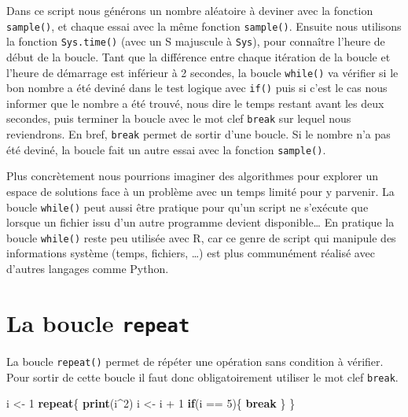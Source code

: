 \documentclass[twoside,symmetric]{book}
\newenvironment{Shaded}{}{}
\newcommand{\ControlFlowTok}[1]{\textbf{#1}}
\newcommand{\DecValTok}[1]{#1}
\newcommand{\KeywordTok}[1]{\textbf{#1}}
\newcommand{\NormalTok}[1]{#1}
\newcommand{\OperatorTok}[1]{#1}
\newcommand{\StringTok}[1]{#1}
\begin{document}
Dans ce script nous générons un nombre aléatoire à deviner avec la fonction \texttt{sample()}, et chaque essai avec la même fonction \texttt{sample()}. Ensuite nous utilisons la fonction \texttt{Sys.time()} (avec un S majuscule à \texttt{Sys}), pour connaître l'heure de début de la boucle. Tant que la différence entre chaque itération de la boucle et l'heure de démarrage est inférieur à 2 secondes, la boucle \texttt{while()} va vérifier si le bon nombre a été deviné dans le test logique avec \texttt{if()} puis si c'est le cas nous informer que le nombre a été trouvé, nous dire le temps restant avant les deux secondes, puis terminer la boucle avec le mot clef \texttt{break} sur lequel nous reviendrons. En bref, \texttt{break} permet de sortir d'une boucle. Si le nombre n'a pas été deviné, la boucle fait un autre essai avec la fonction \texttt{sample()}.

Plus concrètement nous pourrions imaginer des algorithmes pour explorer un espace de solutions face à un problème avec un temps limité pour y parvenir. La boucle \texttt{while()} peut aussi être pratique pour qu'un script ne s'exécute que lorsque un fichier issu d'un autre programme devient disponible\ldots{} En pratique la boucle \texttt{while()} reste peu utilisée avec R, car ce genre de script qui manipule des informations système (temps, fichiers, \ldots{}) est plus communément réalisé avec d'autres langages comme Python.

\hypertarget{l17repeat}{%
\section{\texorpdfstring{La boucle \texttt{repeat}}{La boucle repeat}}\label{l17repeat}}

La boucle \texttt{repeat()} permet de répéter une opération sans condition à vérifier. Pour sortir de cette boucle il faut donc obligatoirement utiliser le mot clef \texttt{break}.

\begin{Shaded}
\begin{Highlighting}[]
\NormalTok{i <-}\StringTok{ }\DecValTok{1}
\ControlFlowTok{repeat}\NormalTok{\{}
  \KeywordTok{print}\NormalTok{(i}\OperatorTok{^}\DecValTok{2}\NormalTok{)}
\NormalTok{  i <-}\StringTok{ }\NormalTok{i }\OperatorTok{+}\StringTok{ }\DecValTok{1}
  \ControlFlowTok{if}\NormalTok{(i }\OperatorTok{==}\StringTok{ }\DecValTok{5}\NormalTok{)\{}
    \ControlFlowTok{break}
\NormalTok{  \}}
\NormalTok{\}}
\end{Highlighting}
\end{Shaded}
\end{document}
